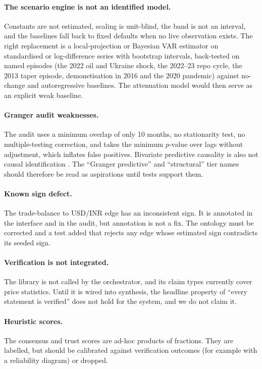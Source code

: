\documentclass[conference]{IEEEtran}
\newcommand{\code}[1]{\texttt{\detokenize{#1}}}
\begin{document}
\paragraph{The scenario engine is not an identified model.}
Constants are not estimated, scaling is unit-blind, the band is not an interval, and the baselines fall back to fixed defaults when no live observation exists. The right replacement is a local-projection or Bayesian VAR estimator on standardised or log-difference series with bootstrap intervals, back-tested on named episodes (the 2022 oil and Ukraine shock, the 2022--23 repo cycle, the 2013 taper episode, demonetisation in 2016 and the 2020 pandemic) against no-change and autoregressive baselines. The attenuation model would then serve as an explicit weak baseline.

\paragraph{Granger audit weaknesses.}
The audit uses a minimum overlap of only 10 months, no stationarity test, no multiple-testing correction, and takes the minimum $p$-value over lags without adjustment, which inflates false positives. Bivariate predictive causality is also not causal identification \cite{pearl2009}. The ``Granger predictive'' and ``structural'' tier names should therefore be read as aspirations until tests support them.

\paragraph{Known sign defect.}
The trade-balance to USD/INR edge has an inconsistent sign. It is annotated in the interface and in the audit, but annotation is not a fix. The ontology must be corrected and a test added that rejects any \code{EMPIRICAL} edge whose estimated sign contradicts its seeded sign.

\paragraph{Verification is not integrated.}
The library is not called by the orchestrator, and its claim types currently cover price statistics. Until it is wired into synthesis, the headline property of ``every statement is verified'' does not hold for the system, and we do not claim it.

\paragraph{Heuristic scores.}
The consensus and trust scores are ad-hoc products of fractions. They are labelled, but should be calibrated against verification outcomes (for example with a reliability diagram) or dropped.
\end{document}
